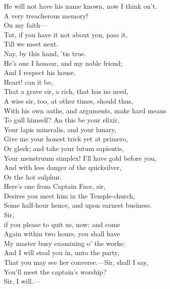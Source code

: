 \documentclass[a4paper,oneside]{memoir}
\begin{document}
\begin{drama*}
He will not have his name known, now I think on't.\\
\surlyspeaks A very treacherous memory!\\
\mammonspeaks {} On my faith---\\
\surlyspeaks Tut, if you have it not about you, pass it,\\
Till we meet next.\\
\mammonspeaks {} Nay, by this hand, 'tis true.\\
He's one I honour, and my noble friend;\\
And I respect his house.\\
\surlyspeaks {} Heart! can it be,\\
That a grave sir, a rich, that has no need,\\
A wise sir, too, at other times, should thus,\\
With his own oaths, and arguments, make hard means\\
To gull himself? An this be your elixir,\\
Your lapis mineralis, and your lunary,\\
Give me your honest trick yet at primero,\\
Or gleek; and take your lutum sapientis,\\
Your menstruum simplex! I'll have gold before you,\\
And with less danger of the quicksilver,\\
Or the hot sulphur.\\
\facespeaks {} Here's one from Captain Face, sir,\\
Desires you meet him in the Temple-church,\\
Some half-hour hence, and upon earnest business.\\
Sir,\\
 if you please to quit us, now; and come\\
Again within two hours, you shall have\\
My master busy examining o' the works;\\
And I will steal you in, unto the party,\\
That you may see her converse.---Sir, shall I say,\\
You'll meet the captain's worship?\\
\surlyspeaks {} Sir, I will.---\\

\end{drama*}
\end{document}
